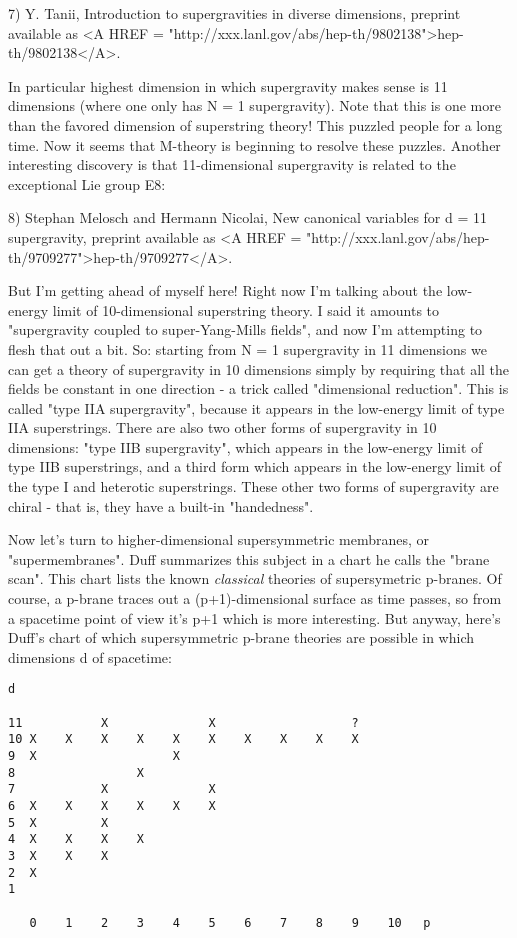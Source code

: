 7) Y. Tanii, Introduction to supergravities in diverse dimensions, preprint
available as <A HREF = "http://xxx.lanl.gov/abs/hep-th/9802138">hep-th/9802138</A>.

In particular highest dimension in which supergravity makes sense is 11
dimensions (where one only has N = 1 supergravity).  Note that this is
one more than the favored dimension of superstring theory!  This puzzled
people for a long time.  Now it seems that M-theory is beginning to
resolve these puzzles.  Another interesting discovery is that
11-dimensional supergravity is related to the exceptional Lie group E8:

8) Stephan Melosch and Hermann Nicolai, New canonical variables for 
d = 11 supergravity, preprint available as <A HREF = "http://xxx.lanl.gov/abs/hep-th/9709277">hep-th/9709277</A>.

But I'm getting ahead of myself here!  Right now I'm talking about the
low-energy limit of 10-dimensional superstring theory.  I said it
amounts to "supergravity coupled to super-Yang-Mills fields", and now
I'm attempting to flesh that out a bit.  So: starting from N = 1
supergravity in 11 dimensions we can get a theory of supergravity in 10
dimensions simply by requiring that all the fields be constant in one
direction - a trick called "dimensional reduction".  This is called
"type IIA supergravity", because it appears in the low-energy limit of
type IIA superstrings.  There are also two other forms of supergravity
in 10 dimensions: "type IIB supergravity", which appears in the
low-energy limit of type IIB superstrings, and a third form which
appears in the low-energy limit of the type I and heterotic
superstrings.  These other two forms of supergravity are chiral - that
is, they have a built-in "handedness".

Now let's turn to higher-dimensional supersymmetric membranes, or
"supermembranes".  Duff summarizes this subject in a chart he
calls the "brane scan".  This chart lists the known
\emph{classical} theories of supersymetric p-branes.  Of course, a p-brane
traces out a (p+1)-dimensional surface as time passes, so from a
spacetime point of view it's p+1 which is more interesting.  But anyway,
here's Duff's chart of which supersymmetric p-brane theories are
possible in which dimensions d of spacetime:

\begin{verbatim}
d

11           X              X                   ?
10 X    X    X    X    X    X    X    X    X    X    
9  X                   X
8                 X
7            X              X
6  X    X    X    X    X    X
5  X         X
4  X    X    X    X
3  X    X    X    
2  X
1

   0    1    2    3    4    5    6    7    8    9    10   p
  
\end{verbatim}
    
